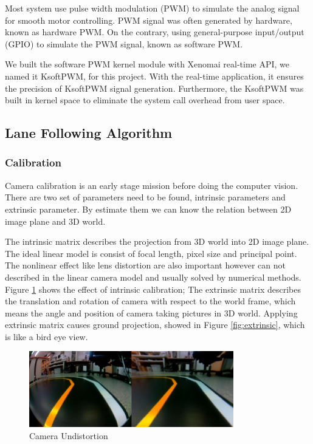 \documentclass[conference]{IEEEtran}
\begin{document}
Most system use pulse width modulation (PWM) to simulate the analog signal for smooth motor controlling. PWM signal was often generated by hardware, known as hardware PWM. On the contrary, using general-purpose input/output (GPIO) to simulate the PWM signal, known as software PWM.

We built the software PWM kernel module with Xenomai real-time API, we named it KsoftPWM, for this project. With the real-time application, it ensures the precision of KsoftPWM signal generation. Furthermore, the KsoftPWM was built in kernel space to eliminate the system call overhead from user space.


\subsection{Lane Following Algorithm}

\subsubsection{Calibration}

Camera calibration is an early stage mission before doing the computer vision. There are two set of parameters need to be found, intrinsic parameters and extrinsic parameter. By estimate them we can know the relation between 2D image plane and 3D world.

The intrinsic matrix describes the projection from 3D world into 2D image plane. The ideal linear model is consist of focal length, pixel size and principal point. The nonlinear effect like lens distortion are also important however can not described in the linear camera model and usually solved by numerical methods. Figure \ref{fig:intrinsic} shows the effect of intrinsic calibration; The extrinsic matrix describes the translation and rotation of camera with respect to the world frame, which means the angle and position of camera taking pictures in 3D world. Applying extrinsic matrix causes ground projection, showed in Figure \ref{fig:extrinsic}, which is like a bird eye view.

\begin{figure}
	\centering
	\includegraphics[width=3.5in]{img/intrinsic.png}
	\caption{Camera Undistortion}
	\label{fig:intrinsic}
\end{figure}
\end{document}
